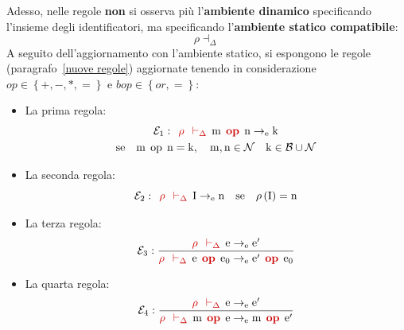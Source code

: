 \documentclass[a4paper]{article}
\begin{document}
	\noindent
	Adesso, nelle regole \textbf{non} si osserva più l'\textbf{ambiente dinamico} specificando l'insieme degli identificatori, ma specificando l'\textbf{ambiente statico compatibile}:
	\begin{equation*}
		\rho \dashv_{\Delta}
	\end{equation*}
	A seguito dell'aggiornamento con l'ambiente statico, si espongono le regole (paragrafo~\ref{nuove regole}) aggiornate tenendo in considerazione $op \in \left\{+,-,*,=\right\}$ e $bop \in \left\{or,=\right\}$:
	\begin{itemize}
		\item La prima regola:
		\begin{gather*}
			\mathcal{E}_{1} : \:\: \textcolor{Red3}{\rho \:\: \vdash_{\Delta}} \:\: \mathrm{m} \:\: \textcolor{Red3}{\mathbf{op}} \:\: \mathrm{n} \rightarrow_{\mathrm{e}} \mathrm{k} \\
			\mathrm{se} \hspace{1em} \mathrm{m} \:\: \mathrm{op} \:\: \mathrm{n} = \mathrm{k}, \hspace{1em} \mathrm{m,n} \in \mathcal{N} \hspace{1em} \mathrm{k} \in \mathcal{B} \cup \mathcal{N}
		\end{gather*}
		
		\item La seconda regola:
		\begin{equation*}
			\mathcal{E}_{2} : \:\: \textcolor{Red3}{\rho \:\: \vdash_{\Delta}} \:\: \mathrm{I} \rightarrow_{\mathrm{e}} \mathrm{n} \hspace{1em} \mathrm{se} \hspace{1em} \rho\left(\mathrm{I}\right) = \mathrm{n}
		\end{equation*}
		
		\item La terza regola:
		\begin{equation*}
			\mathcal{E}_{3} : \dfrac{
				\textcolor{Red3}{\rho \:\: \vdash_{\Delta}} \:\: \mathrm{e} \rightarrow_{\mathrm{e}} \mathrm{e}'
			}{
				\textcolor{Red3}{\rho \:\: \vdash_{\Delta}} \:\: \mathrm{e} \:\: \textcolor{Red3}{\mathbf{op}} \:\: \mathrm{e}_{0} \rightarrow_{\mathrm{e}} \mathrm{e}' \:\: \textcolor{Red3}{\mathbf{op}} \:\: \mathrm{e}_{0}
			}
		\end{equation*}
		
		\item La quarta regola:
		\begin{equation*}
			\mathcal{E}_{4} : \dfrac{
				\textcolor{Red3}{\rho \:\: \vdash_{\Delta}} \:\: \mathrm{e} \rightarrow_{\mathrm{e}} \mathrm{e}'
			}{
				\textcolor{Red3}{\rho \:\: \vdash_{\Delta}} \:\: \mathrm{m} \:\: \textcolor{Red3}{\mathbf{op}} \:\: \mathrm{e} \rightarrow_{\mathrm{e}} \mathrm{m} \:\: \textcolor{Red3}{\mathbf{op}} \:\: \mathrm{e}'
			}
		\end{equation*}
		

\end{itemize}
\end{document}
